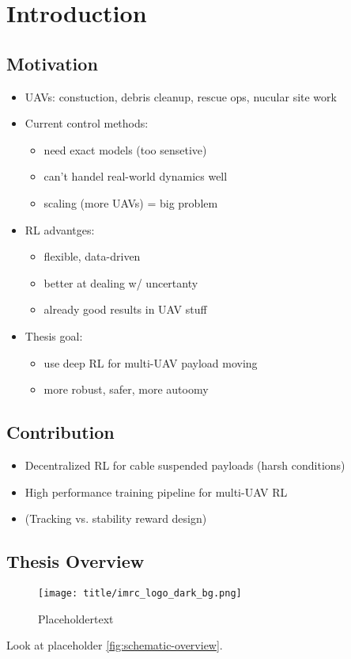 \chapter{Introduction}

\section{Motivation}
\begin{itemize}
    \item UAVs: constuction, debris cleanup, rescue ops, nucular site work
    
    \item Current control methods:
    \begin{itemize}
        \item need exact models (too sensetive)
        \item can't handel real-world dynamics well
        \item scaling (more UAVs) = big problem
    \end{itemize}
    
    \item RL advantges:
    \begin{itemize}
        \item flexible, data-driven
        \item better at dealing w/ uncertanty
        \item already good results in UAV stuff
    \end{itemize}
    
    \item Thesis goal:
    \begin{itemize}
        \item use deep RL for multi-UAV payload moving
        \item more robust, safer, more autoomy
    \end{itemize}
\end{itemize}
\section{Contribution}
\begin{itemize}
    \item Decentralized RL for cable suspended payloads (harsh conditions)
    \item High performance training pipeline for multi-UAV RL
    \item (Tracking vs. stability reward design)
\end{itemize}
\section{Thesis Overview}
\begin{figure}
    \centering
    \texttt{[image: title/imrc\_logo\_dark\_bg.png]}
    \caption{Placeholdertext}
    \label{fig:schematic-overview}
\end{figure}
Look at placeholder \autoref{fig:schematic-overview}.